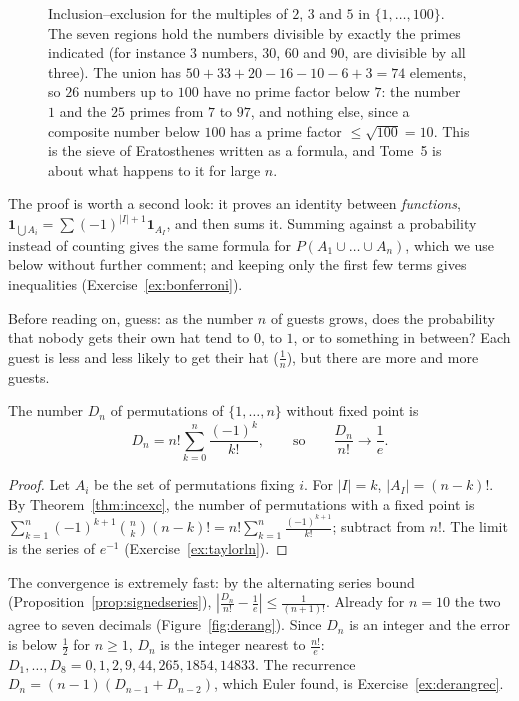 \begin{figure}[ht]
\centering
{}
\caption{Inclusion--exclusion for the multiples of $2$, $3$ and $5$ in $\{1,\dots,100\}$. The seven regions hold the numbers divisible by exactly the primes indicated (for instance $3$ numbers, $30$, $60$ and $90$, are divisible by all three). The union has $50+33+20-16-10-6+3=74$ elements, so $26$ numbers up to $100$ have no prime factor below $7$: the number $1$ and the $25$ primes from $7$ to $97$, and nothing else, since a composite number below $100$ has a prime factor $\le\sqrt{100}=10$. This is the sieve of Eratosthenes written as a formula, and Tome~5 is about what happens to it for large $n$.}
\label{fig:venn}
\end{figure}

The proof is worth a second look: it proves an identity between \emph{functions}, $\mathbf 1_{\bigcup A_i}=\sum(-1)^{|I|+1}\mathbf 1_{A_I}$, and then sums it. Summing against a probability instead of counting gives the same formula for $P(A_1\cup\dots\cup A_n)$, which we use below without further comment; and keeping only the first few terms gives inequalities (Exercise~\ref{ex:bonferroni}).

\begin{think}
Before reading on, guess: as the number $n$ of guests grows, does the probability that nobody gets their own hat tend to $0$, to $1$, or to something in between? Each guest is less and less likely to get their hat ($\frac1n$), but there are more and more guests.
\end{think}

\begin{proposition}[derangements]\label{prop:derang}
The number $D_n$ of permutations of $\{1,\dots,n\}$ without fixed point is
\[
D_n=n!\sum_{k=0}^n\frac{(-1)^k}{k!},\qquad\text{so}\qquad\frac{D_n}{n!}\to\frac1e.
\]
\end{proposition}
\begin{proof}
Let $A_i$ be the set of permutations fixing $i$. For $|I|=k$, $|A_I|=(n-k)!$. By Theorem~\ref{thm:incexc}, the number of permutations with a fixed point is
$\sum_{k=1}^n(-1)^{k+1}\binom nk(n-k)!=n!\sum_{k=1}^n\frac{(-1)^{k+1}}{k!}$; subtract from $n!$. The limit is the series of $e^{-1}$ (Exercise~\ref{ex:taylorln}).
\end{proof}

The convergence is extremely fast: by the alternating series bound (Proposition~\ref{prop:signedseries}), $\left|\frac{D_n}{n!}-\frac1e\right|\le\frac1{(n+1)!}$. Already for $n=10$ the two agree to seven decimals (Figure~\ref{fig:derang}). Since $D_n$ is an integer and the error is below $\frac12$ for $n\ge1$, $D_n$ is the integer nearest to $\frac{n!}e$: $D_1,\dots,D_8=0,1,2,9,44,265,1854,14833$. The recurrence $D_n=(n-1)(D_{n-1}+D_{n-2})$, which Euler found, is Exercise~\ref{ex:derangrec}.

